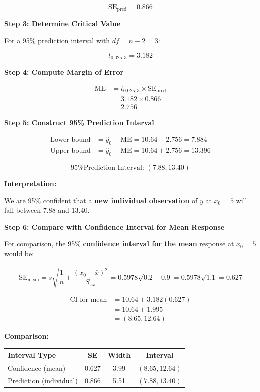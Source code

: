 \documentclass[12pt]{article}
\begin{document}
\begin{solution}
\[
\boxed{\text{SE}_{\text{pred}} = 0.866}
\]

\textbf{Step 3: Determine Critical Value}

For a 95\% prediction interval with $df = n - 2 = 3$:

\[
t_{0.025, 3} = 3.182
\]

\textbf{Step 4: Compute Margin of Error}

\begin{align*}
\text{ME} &= t_{0.025, 3} \times \text{SE}_{\text{pred}} \\
&= 3.182 \times 0.866 \\
&= 2.756
\end{align*}

\textbf{Step 5: Construct 95\% Prediction Interval}

\begin{align*}
\text{Lower bound} &= \hat{y}_0 - \text{ME} = 10.64 - 2.756 = 7.884 \\
\text{Upper bound} &= \hat{y}_0 + \text{ME} = 10.64 + 2.756 = 13.396
\end{align*}

\[
\boxed{\text{95\% Prediction Interval: } (7.88, 13.40)}
\]

\textbf{Interpretation:}

We are 95\% confident that a \textbf{new individual observation} of $y$ at $x_0 = 5$ will fall between 7.88 and 13.40.

\textbf{Step 6: Compare with Confidence Interval for Mean Response}

For comparison, the 95\% \textbf{confidence interval for the mean} response at $x_0 = 5$ would be:

\[
\text{SE}_{\text{mean}} = s\sqrt{\frac{1}{n} + \frac{(x_0 - \bar{x})^2}{S_{xx}}} = 0.5978\sqrt{0.2 + 0.9} = 0.5978\sqrt{1.1} = 0.627
\]

\begin{align*}
\text{CI for mean} &= 10.64 \pm 3.182(0.627) \\
&= 10.64 \pm 1.995 \\
&= (8.65, 12.64)
\end{align*}

\textbf{Comparison:}

\begin{center}
\begin{tabular}{|l|c|c|c|}
\hline
\textbf{Interval Type} & \textbf{SE} & \textbf{Width} & \textbf{Interval} \\
\hline
Confidence (mean) & 0.627 & 3.99 & $(8.65, 12.64)$ \\
Prediction (individual) & 0.866 & 5.51 & $(7.88, 13.40)$ \\
\hline
\end{tabular}
\end{center}


\end{solution}
\end{document}
